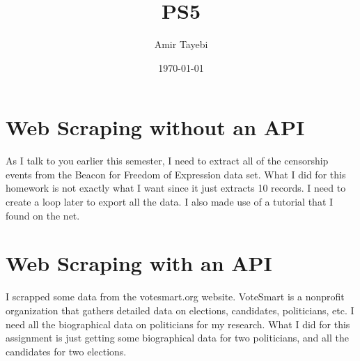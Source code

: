 \documentclass{article}
\title{PS5}
\author{Amir Tayebi}
\date{\today}
\begin{document}
\maketitle

\section{Web Scraping without an API}

As I talk to you earlier this semester, I need to extract all of the censorship events from the Beacon for Freedom of Expression data set. What I did for this homework is not exactly what I want since it just extracts 10 records. I need to create a loop later to export all the data.
I also made use of a tutorial that I found on the net.

\section{Web Scraping with an API}

I scrapped some data from the votesmart.org website. VoteSmart is a nonprofit organization that gathers detailed data on elections, candidates, politicians, etc.  I need all the biographical data on politicians for my research. What I did for this assignment is just getting some biographical data for two politicians, and all the candidates for two elections.
\end{document}
